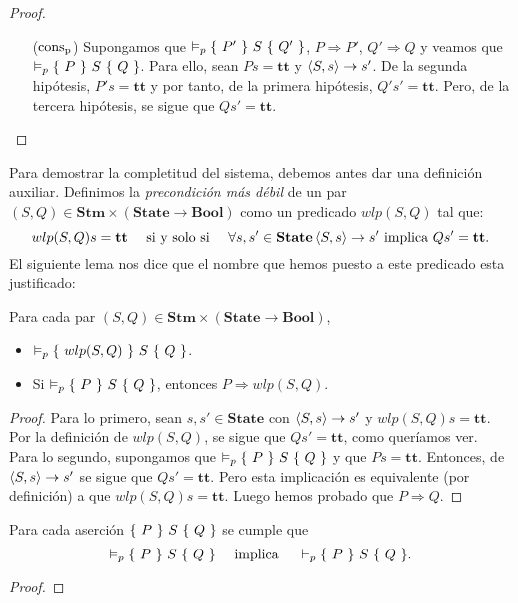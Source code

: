 \begin{proof}
\begin{itemize}
    \item[($\mathrm{cons}_{\mathrm{p}}$)] Supongamos que $\vDash_p \{\, \, P' \, \, \}\, \, S\, \, \{ \, \, Q' \, \, \}$, $P \Rightarrow P'$, $Q' \Rightarrow Q$ y veamos que $\vDash_p \{\, \, P \, \, \}\, \, S\, \, \{ \, \, Q \, \, \}$. Para ello, sean $Ps = \mathbf{tt}$ y $\langle S, s \rangle\to s'$. De la segunda hipótesis, $P's = \mathbf{tt}$ y por tanto, de la primera hipótesis, $Q's' = \mathbf{tt}$. Pero, de la tercera hipótesis, se sigue que $Qs' = \mathbf{tt}$.
\end{itemize}
\end{proof}

Para demostrar la completitud del sistema, debemos antes dar una definición auxiliar. Definimos la \textit{precondición más débil} de un par $(S, Q) \in \mathbf{Stm}\times(\mathbf{State} \to \mathbf{Bool})$ como un predicado $wlp(S, Q)$ tal que:
$$wlp(S, Q)s = \mathbf{tt} \quad \text{ si y solo si }\quad \forall s, s' \in \mathbf{State}\, \langle S, s \rangle\to s' \text{ implica } Qs' = \mathbf{tt}.$$
El siguiente lema nos dice que el nombre que hemos puesto a este predicado esta justificado: 

\begin{lema}
Para cada par $(S,  Q)\in \mathbf{Stm}\times(\mathbf{State} \to \mathbf{Bool})$, 
\begin{itemize}
    \item $\vDash_p \{\, \, wlp(S, Q) \, \, \}\, \, S\, \, \{ \, \, Q \, \, \}$.
    \item Si $\vDash_p \{\, \, P \, \, \}\, \, S\, \, \{ \, \, Q \, \, \}$, entonces $P \Rightarrow wlp(S, Q)$.
\end{itemize}
\end{lema}
\begin{proof}
Para lo primero, sean $s, s' \in \mathbf{State}$ con $\langle S, s \rangle\to s'$ y $wlp(S, Q)s = \mathbf{tt}$. Por la definición de $wlp(S, Q)$, se sigue que $Qs' = \mathbf{tt}$, como queríamos ver. 
\\

Para lo segundo, supongamos que $\vDash_p \{\, \, P \, \, \}\, \, S\, \, \{ \, \, Q \, \, \}$ y que $Ps = \mathbf{tt}$. Entonces, de $\langle S, s \rangle\to s'$ se sigue que $Qs' = \mathbf{tt}$. Pero esta implicación es equivalente (por definición) a que $wlp(S, Q)s = \mathbf{tt}$. Luego hemos probado que $P \Rightarrow Q$. 
\end{proof}

\begin{theorem}[De Completitud]
Para cada aserción $\{\, \, P \, \, \}\, \, S\, \, \{ \, \, Q \, \, \}$ se cumple que 
$$\vDash_p \{\, \, P \, \, \}\, \, S\, \, \{ \, \, Q \, \, \}\quad \text{ implica }\quad\vdash_p \{\, \, P \, \, \}\, \, S\, \, \{ \, \, Q \, \, \}.$$
\end{theorem}
\begin{proof}

\end{proof}